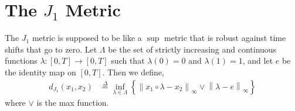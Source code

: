 \documentclass[12pt]{article}
\newcommand\norm[1]{\left\lVert#1\right\rVert}
\newcommand{\define}{\overset{\Delta}{=}}
\theoremstyle{definition}
\theoremstyle{definition}
\theoremstyle{definition}
\begin{document}
\section*{The $J_1$ Metric}
The $J_1$ metric is supposed to be like a $\sup$ metric that is robust against time shifts that go to zero. Let $\Lambda$ be the set of strictly increasing and continuous functions $\lambda:[0,T]\rightarrow [0,T]$ such that $\lambda(0)=0$ and $\lambda(1) = 1$, and let $e$ be the identity map on $[0,T]$.  Then we define,
\begin{align}
d_{J_1}(x_1,x_2)&\define\inf_{\lambda\in \Lambda}\left\{\norm{x_1\circ \lambda -x_2}_{\infty}\lor \norm{\lambda-e}_{\infty}\right\}\label{J1Norm}
\end{align}
where $\lor$ is the max function.\\
\end{document}
